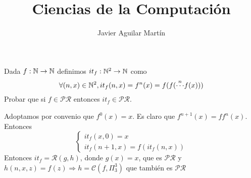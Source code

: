 \documentclass[twoside]{article}
\begin{document}
\title{Ciencias de la Computación}

\author{Javier Aguilar Martín}
\maketitle

\begin{ejercicio}{4}
Dada $f : \mathbb{N} \to \mathbb{N}$ definimos $it_f : \mathbb{N}^2 \to \mathbb{N}$ como
$$\forall (n, x) \in \mathbb{N}^2, it_f (n, x) = f^n(x) = f(f(\overset{n}{\cdots}f(x)))$$
Probar que si $f \in \mathcal{PR}$ entonces $it_f \in \mathcal{PR}$.

\end{ejercicio}
\begin{solucion}
Adoptamos por convenio que $f^0(x)=x$. Es claro que $f^{n+1}(x)=ff^n(x)$.
Entonces
\[
\begin{cases}
it_f(x,0)=x\\
it_f(n+1,x)=f(it_f(n,x))
\end{cases}
\]
Entonces $it_f=\mathcal{R}(g,h)$, donde $g(x)=x$, que es $\mathcal{PR}$ y $h(n,x,z)=f(z)\Rightarrow h=\mathcal{C}(f,\Pi^3_3)$ que también es $\mathcal{PR}$
\end{solucion}

\newpage
\end{document}
